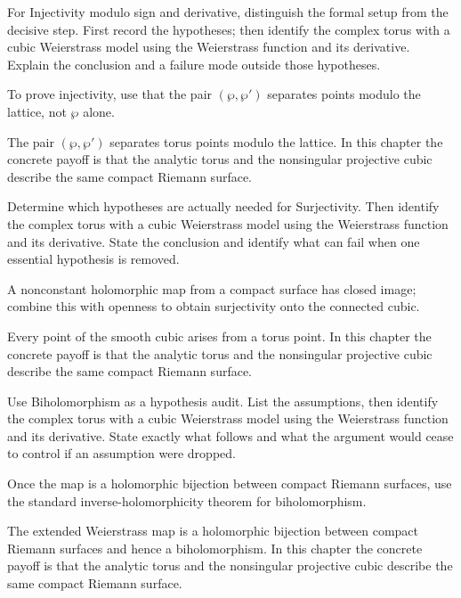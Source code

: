 \begin{exercise}\label{exr:iv31-04}
For Injectivity modulo sign and derivative, distinguish the formal setup from the decisive step. First record the hypotheses; then identify the complex torus with a cubic Weierstrass model using the Weierstrass function and its derivative. Explain the conclusion and a failure mode outside those hypotheses.
\end{exercise}
\begin{hint}
To prove injectivity, use that the pair \((\wp,\wp')\) separates points modulo the lattice, not \(\wp\) alone.
\end{hint}
\begin{solution}
The pair $(\wp,\wp')$ separates torus points modulo the lattice. In this chapter the concrete payoff is that the analytic torus and the nonsingular projective cubic describe the same compact Riemann surface.
\end{solution}

\begin{exercise}\label{exr:iv31-05}
Determine which hypotheses are actually needed for Surjectivity. Then identify the complex torus with a cubic Weierstrass model using the Weierstrass function and its derivative. State the conclusion and identify what can fail when one essential hypothesis is removed.
\end{exercise}
\begin{hint}
A nonconstant holomorphic map from a compact surface has closed image; combine this with openness to obtain surjectivity onto the connected cubic.
\end{hint}
\begin{solution}
Every point of the smooth cubic arises from a torus point. In this chapter the concrete payoff is that the analytic torus and the nonsingular projective cubic describe the same compact Riemann surface.
\end{solution}

\begin{exercise}\label{exr:iv31-06}
Use Biholomorphism as a hypothesis audit. List the assumptions, then identify the complex torus with a cubic Weierstrass model using the Weierstrass function and its derivative. State exactly what follows and what the argument would cease to control if an assumption were dropped.
\end{exercise}
\begin{hint}
Once the map is a holomorphic bijection between compact Riemann surfaces, use the standard inverse-holomorphicity theorem for biholomorphism.
\end{hint}
\begin{solution}
The extended Weierstrass map is a holomorphic bijection between compact Riemann surfaces and hence a biholomorphism. In this chapter the concrete payoff is that the analytic torus and the nonsingular projective cubic describe the same compact Riemann surface.
\end{solution}


